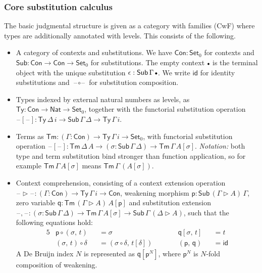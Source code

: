 \documentclass[acmsmall,screen,review]{acmart}
\newcommand{\msf}[1]{{\mathsf{#1}}}
\newcommand{\p}{\mathsf{p}}
\newcommand{\q}{\mathsf{q}}
\newcommand{\Set}{\msf{Set}}
\newcommand{\Nat}{\msf{Nat}}
\newcommand{\blank}{{\mathord{\hspace{1pt}\text{--}\hspace{1pt}}}}
\newcommand{\emptycon}{\scaleobj{.75}\bullet}
\newcommand{\id}{\msf{id}}
\newcommand{\Con}{\msf{Con}}
\newcommand{\Sub}{\msf{Sub}}
\newcommand{\Ty}{\msf{Ty}}
\newcommand{\Tm}{\msf{Tm}}
\newcommand{\ext}{\triangleright}
\begin{document}
\subsubsection{Core substitution calculus} The basic judgmental structure is given
as a category with families (CwF) \cite{Dybjer96internaltype,cwfs} where types are additionally
annotated with levels. This consists of the following.
\begin{itemize}
\item A category of contexts and substitutions. We have $\Con : \Set_0$ for contexts and $\Sub : \Con \to \Con \to \Set_0$
  for substitutions. The empty context $\emptycon$ is the terminal object with the unique substitution $\epsilon : \Sub\,\Gamma\,\emptycon$.
  We write $\id$ for identity substitutions and $\blank\!\circ\!\blank$ for substitution composition.
\item Types indexed by external natural numbers as levels, as $\Ty : \Con \to \Nat \to \Set_0$,
  together with the functorial substitution operation $\blank[\blank] : \Ty\,\Delta\,i \to
  \Sub\,\Gamma\,\Delta \to \Ty\,\Gamma\,i$.
\item Terms as $\Tm : (\Gamma : \Con) \to \Ty\,\Gamma\,i \to \Set_0$, with functorial substitution operation
  $\blank[\blank] : \Tm\,\Delta\,A \to (\sigma : \Sub\,\Gamma\,\Delta) \to \Tm\,\Gamma\,A[\sigma]$.
  \emph{Notation:} both type and term substitution bind stronger than function application, so
  for example $\Tm\,\Gamma\,A[\sigma]$ means $\Tm\,\Gamma\,(A[\sigma])$.
\item Context comprehension, consisting of a context extension operation $\blank\!\ext\!\blank : (\Gamma : \Con) \to \Ty\,\Gamma\,i \to \Con$,
  weakening morphism $\p : \Sub\,(\Gamma\ext A)\,\Gamma$, zero variable $\q : \Tm\,(\Gamma\ext A)\,A[\p]$ and substitution extension $\blank,\!\blank : (\sigma : \Sub\,\Gamma\,\Delta) \to \Tm\,\Gamma\,A[\sigma] \to \Sub\,\Gamma\,(\Delta\ext A)$, such that the following equations hold:
  \begin{alignat*}{5}
    &\p \circ (\sigma,\,t)     &&= \sigma                             &&\q[\sigma,\,t] &&= t\\
    &(\sigma,\,t) \circ \delta &&= (\sigma \circ \delta,\,t[\delta])\hspace{2em} && (\p,\,\q) &&= \id
  \end{alignat*}
  A De Bruijn index $N$ is represented as $\q[\p^N]$, where $\p^N$ is $N$-fold composition
  of weakening.
\end{itemize}
\end{document}
